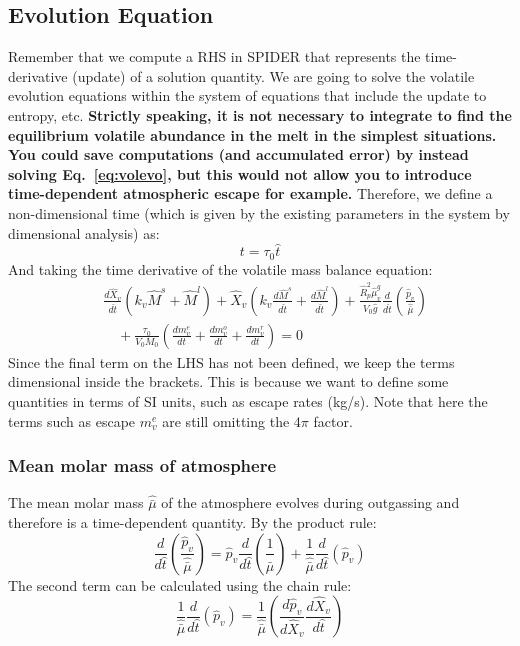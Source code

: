 \subsection{Evolution Equation}
Remember that we compute a RHS in SPIDER that represents the time-derivative (update) of a solution quantity.  We are going to solve the volatile evolution equations within the system of equations that include the update to entropy, etc.  \textbf{Strictly speaking, it is not necessary to integrate to find the equilibrium volatile abundance in the melt in the simplest situations.  You could save computations (and accumulated error) by instead solving Eq.~\ref{eq:volevo}, but this would not allow you to introduce time-dependent atmospheric escape for example.}  Therefore, we define a non-dimensional time (which is given by the existing parameters in the system by dimensional analysis) as:
\begin{equation}
t = \tau_0 \hat{t}
\end{equation}
And taking the time derivative of the volatile mass balance equation:
\begin{align}
& \frac{d \hat{X}_v}{d \hat{t}} (k_v \hat{M}^s + \hat{M}^l) +
\hat{X}_v \left( k_v \frac{d \hat{M}^s}{d \hat{t}} + \frac{d \hat{M}^l}{d \hat{t}} \right) + 
\frac{\hat{R}_p^2 \hat{\mu}_v^g}{V_0 \hat{g}} \frac{d}{d\hat{t}} \left( \frac{\hat{p}_v}{\hat{\bar{\mu}}} \right)\\
&\quad + \frac{\tau_0}{V_0 M_0} \left( \frac{dm_v^e}{dt} +  \frac{dm_v^o}{dt} + \frac{dm_v^r}{dt} \right) = 0
\end{align}
Since the final term on the LHS has not been defined, we keep the terms dimensional inside the brackets.  This is because we want to define some quantities in terms of SI units, such as escape rates (kg/s).  Note that here the terms such as escape $m_v^e$ are still omitting the $4 \pi$ factor.
\subsubsection{Mean molar mass of atmosphere}
The mean molar mass $\hat{\bar{\mu}}$ of the atmosphere evolves during outgassing and therefore is a time-dependent quantity.  By the product rule:
\begin{equation}
\frac{d}{d\hat{t}} \left( \frac{\hat{p}_v}{\hat{\bar{\mu}}} \right) = \hat{p}_v \frac{d}{d\hat{t}} \left( \frac{1}{\hat{\bar{\mu}}} \right) + \frac{1}{\hat{\bar{\mu}}} \frac{d}{d\hat{t}} \left( \hat{p}_v \right)
\label{eq:atmos_evo}
\end{equation}
The second term can be calculated using the chain rule:
\begin{equation}
\frac{1}{\hat{\bar{\mu}}} \frac{d}{d\hat{t}} \left( \hat{p}_v \right) = \frac{1}{\hat{\bar{\mu}}} \left( \frac{d \hat{p}_v}{d \hat{X}_v} \frac{d \hat{X}_v}{d\hat{t}} \right)
\end{equation}
